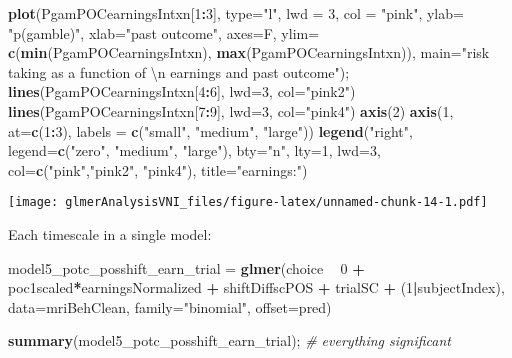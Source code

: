 \documentclass[]{article}
\newenvironment{Shaded}{\begin{snugshade}}{\end{snugshade}}
\newcommand{\CharTok}[1]{\textcolor[rgb]{0.31,0.60,0.02}{#1}}
\newcommand{\CommentTok}[1]{\textcolor[rgb]{0.56,0.35,0.01}{\textit{#1}}}
\newcommand{\DataTypeTok}[1]{\textcolor[rgb]{0.13,0.29,0.53}{#1}}
\newcommand{\DecValTok}[1]{\textcolor[rgb]{0.00,0.00,0.81}{#1}}
\newcommand{\KeywordTok}[1]{\textcolor[rgb]{0.13,0.29,0.53}{\textbf{#1}}}
\newcommand{\NormalTok}[1]{#1}
\newcommand{\OperatorTok}[1]{\textcolor[rgb]{0.81,0.36,0.00}{\textbf{#1}}}
\newcommand{\StringTok}[1]{\textcolor[rgb]{0.31,0.60,0.02}{#1}}
\begin{document}
\begin{Shaded}
\begin{Highlighting}[]
\KeywordTok{plot}\NormalTok{(PgamPOCearningsIntxn[}\DecValTok{1}\OperatorTok{:}\DecValTok{3}\NormalTok{], }\DataTypeTok{type=}\StringTok{"l"}\NormalTok{, }\DataTypeTok{lwd =} \DecValTok{3}\NormalTok{, }\DataTypeTok{col =} \StringTok{"pink"}\NormalTok{, }\DataTypeTok{ylab=} \StringTok{"p(gamble)"}\NormalTok{, }\DataTypeTok{xlab=}\StringTok{"past outcome"}\NormalTok{, }\DataTypeTok{axes=}\NormalTok{F, }\DataTypeTok{ylim=} \KeywordTok{c}\NormalTok{(}\KeywordTok{min}\NormalTok{(PgamPOCearningsIntxn), }\KeywordTok{max}\NormalTok{(PgamPOCearningsIntxn)), }\DataTypeTok{main=}\StringTok{"risk taking as a function of }\CharTok{\textbackslash{}n}\StringTok{ earnings and past outcome"}\NormalTok{);}
\KeywordTok{lines}\NormalTok{(PgamPOCearningsIntxn[}\DecValTok{4}\OperatorTok{:}\DecValTok{6}\NormalTok{], }\DataTypeTok{lwd=}\DecValTok{3}\NormalTok{, }\DataTypeTok{col=}\StringTok{"pink2"}\NormalTok{)}
\KeywordTok{lines}\NormalTok{(PgamPOCearningsIntxn[}\DecValTok{7}\OperatorTok{:}\DecValTok{9}\NormalTok{], }\DataTypeTok{lwd=}\DecValTok{3}\NormalTok{, }\DataTypeTok{col=}\StringTok{"pink4"}\NormalTok{)}
\KeywordTok{axis}\NormalTok{(}\DecValTok{2}\NormalTok{)}
\KeywordTok{axis}\NormalTok{(}\DecValTok{1}\NormalTok{, }\DataTypeTok{at=}\KeywordTok{c}\NormalTok{(}\DecValTok{1}\OperatorTok{:}\DecValTok{3}\NormalTok{), }\DataTypeTok{labels =} \KeywordTok{c}\NormalTok{(}\StringTok{"small"}\NormalTok{, }\StringTok{"medium"}\NormalTok{, }\StringTok{"large"}\NormalTok{))}
\KeywordTok{legend}\NormalTok{(}\StringTok{"right"}\NormalTok{, }\DataTypeTok{legend=}\KeywordTok{c}\NormalTok{(}\StringTok{"zero"}\NormalTok{, }\StringTok{"medium"}\NormalTok{, }\StringTok{"large"}\NormalTok{), }\DataTypeTok{bty=}\StringTok{"n"}\NormalTok{, }\DataTypeTok{lty=}\DecValTok{1}\NormalTok{, }\DataTypeTok{lwd=}\DecValTok{3}\NormalTok{, }\DataTypeTok{col=}\KeywordTok{c}\NormalTok{(}\StringTok{"pink"}\NormalTok{,}\StringTok{"pink2"}\NormalTok{, }\StringTok{"pink4"}\NormalTok{), }\DataTypeTok{title=}\StringTok{"earnings:"}\NormalTok{)}
\end{Highlighting}
\end{Shaded}

\texttt{[image: glmerAnalysisVNI\_files/figure-latex/unnamed-chunk-14-1.pdf]}

Each timescale in a single model:

\begin{Shaded}
\begin{Highlighting}[]
\NormalTok{model5_potc_posshift_earn_trial =}\StringTok{ }\KeywordTok{glmer}\NormalTok{(choice }\OperatorTok{~}\StringTok{ }\DecValTok{0} \OperatorTok{+}\StringTok{ }\NormalTok{poc1scaled}\OperatorTok{*}\NormalTok{earningsNormalized }\OperatorTok{+}\StringTok{ }\NormalTok{shiftDiffscPOS }\OperatorTok{+}\StringTok{ }\NormalTok{trialSC }\OperatorTok{+}\StringTok{ }\NormalTok{(}\DecValTok{1}\OperatorTok{|}\NormalTok{subjectIndex), }\DataTypeTok{data=}\NormalTok{mriBehClean, }\DataTypeTok{family=}\StringTok{"binomial"}\NormalTok{, }\DataTypeTok{offset=}\NormalTok{pred)}

\KeywordTok{summary}\NormalTok{(model5_potc_posshift_earn_trial); }\CommentTok{# everything significant}
\end{Highlighting}
\end{Shaded}
\end{document}
